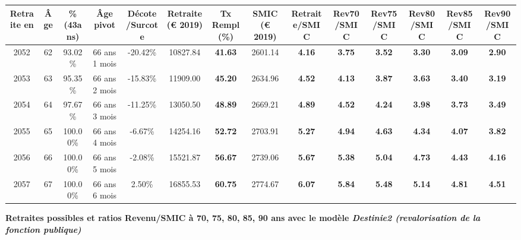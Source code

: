 \begin{adjustbox}{max width=\textwidth} 
\begin{tabular}[htb]{|c|c||c|c|c||c|c||c||c|c|c|c|c|c|} 
\hline 
 Retraite en &  Âge &  \%(43ans) &  Âge pivot &  Décote/Surcote &  Retraite (\euro{} 2019) &  Tx Rempl(\%) &  SMIC (\euro{} 2019) &  Retraite/SMIC &  Rev70/SMIC &  Rev75/SMIC &  Rev80/SMIC &  Rev85/SMIC &  Rev90/SMIC \\ 
\hline \hline 
 2052 &  62 &  93.02\% &  66 ans 1 mois &  -20.42\% &  10827.84 &  {\bf 41.63} &  2601.14 &  {\bf 4.16} &  {\bf 3.75} &  {\bf 3.52} &  {\bf 3.30} &  {\bf 3.09} &  {\bf 2.90} \\ 
\hline 
 2053 &  63 &  95.35\% &  66 ans 2 mois &  -15.83\% &  11909.00 &  {\bf 45.20} &  2634.96 &  {\bf 4.52} &  {\bf 4.13} &  {\bf 3.87} &  {\bf 3.63} &  {\bf 3.40} &  {\bf 3.19} \\ 
\hline 
 2054 &  64 &  97.67\% &  66 ans 3 mois &  -11.25\% &  13050.50 &  {\bf 48.89} &  2669.21 &  {\bf 4.89} &  {\bf 4.52} &  {\bf 4.24} &  {\bf 3.98} &  {\bf 3.73} &  {\bf 3.49} \\ 
\hline 
 2055 &  65 &  100.00\% &  66 ans 4 mois &  -6.67\% &  14254.16 &  {\bf 52.72} &  2703.91 &  {\bf 5.27} &  {\bf 4.94} &  {\bf 4.63} &  {\bf 4.34} &  {\bf 4.07} &  {\bf 3.82} \\ 
\hline 
 2056 &  66 &  100.00\% &  66 ans 5 mois &  -2.08\% &  15521.87 &  {\bf 56.67} &  2739.06 &  {\bf 5.67} &  {\bf 5.38} &  {\bf 5.04} &  {\bf 4.73} &  {\bf 4.43} &  {\bf 4.16} \\ 
\hline 
 2057 &  67 &  100.00\% &  66 ans 6 mois &  2.50\% &  16855.53 &  {\bf 60.75} &  2774.67 &  {\bf 6.07} &  {\bf 5.84} &  {\bf 5.48} &  {\bf 5.14} &  {\bf 4.81} &  {\bf 4.51} \\ 
\hline 
\hline 
\end{tabular} 
\end{adjustbox} 
 
 \vspace{0.1cm} 
{\bf \noindent Retraites possibles et ratios Revenu/SMIC à 70, 75, 80, 85, 90 ans avec le modèle \emph{Destinie2 (revalorisation de la fonction publique)}}  
 
